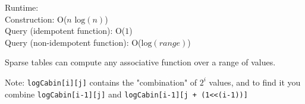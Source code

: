 
Runtime: \\
\indent Construction: O($n\text{ log}(n)$) \\
\indent Query (idempotent function): O($1$) \\
\indent Query (non-idempotent function): O($\text{log}(range)$)

Sparse tables can compute any associative function over a range of values.

Note: \lstinline{logCabin[i][j]} contains the "combination" of $2^i$ values, and to find it you combine \lstinline{logCabin[i-1][j]} and \lstinline{logCabin[i-1][j + (1<<(i-1))]}



\newpage
